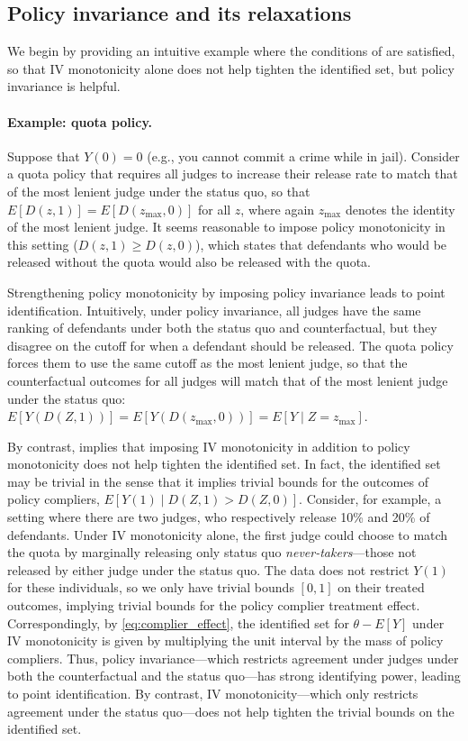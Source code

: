 \documentclass[12pt]{article}%
\theoremstyle{definition}
\newcommand\1{\operatorname{I}\indicatorfence}
\begin{document}
\subsection{Policy invariance and its relaxations}

We begin by providing an intuitive example where the conditions of
 are satisfied, so that IV monotonicity
alone does not help tighten the identified set, but policy invariance is
helpful.

\paragraph{Example: quota policy.} Suppose that $Y(0)=0$ (e.g., you cannot
commit a crime while in jail). Consider a quota policy that requires all judges
to increase their release rate to match that of the most lenient judge under the
status quo, so that $E[D(z,1)] = E[D(z_{\max},0)]$ for all $z$, where again
$z_{\max}$ denotes the identity of the most lenient judge. It seems reasonable
to impose policy monotonicity in this setting ($D(z,1) \geq D(z,0)$), which
states that defendants who would be released without the quota would also be
released with the quota.

Strengthening policy monotonicity by imposing policy invariance leads to point
identification. Intuitively, under policy invariance, all judges have the same
ranking of defendants under both the status quo and counterfactual, but they
disagree on the cutoff for when a defendant should be released. The quota policy
forces them to use the same cutoff as the most lenient judge, so that the
counterfactual outcomes for all judges will match that of the most lenient judge
under the status quo:
$E[Y(D(Z,1))] = E[Y(D(z_{\max},0))] = E[Y \mid Z =z_{\max}]$.

By contrast,  implies that imposing
IV monotonicity in addition to policy monotonicity does not help tighten
the identified set. In fact, the identified set may be trivial in the sense that
it implies trivial bounds for the outcomes of policy compliers,
$E[Y(1)\mid D(Z,1)>D(Z,0)]$. Consider, for example, a setting where there are
two judges, who respectively release 10\% and 20\% of defendants. Under IV
monotonicity alone, the first judge could choose to match the quota by marginally releasing
only status quo \emph{never-takers}---those not released by either judge under
the status quo. The data does not restrict $Y(1)$ for these individuals, so we
only have trivial bounds $[0,1]$ on their treated outcomes,
implying trivial bounds for the policy complier treatment effect. Correspondingly, by
\cref{eq:complier_effect}, the identified set for $\theta - E[Y]$ under IV monotonicity is
given by multiplying the unit interval by the mass of policy compliers. Thus, policy
invariance---which restricts agreement under judges under both the
counterfactual and the status quo---has strong identifying power, leading to
point identification. By contrast, IV monotonicity---which only restricts agreement
under the status quo---does not help tighten the trivial bounds on the
identified set.
\end{document}
